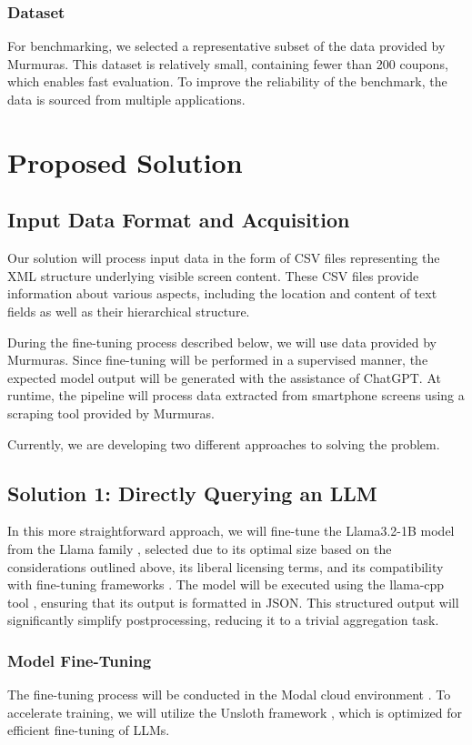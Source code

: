 \documentclass[12pt]{article}
\begin{document}
\subsubsection*{Dataset}
For benchmarking, we selected a representative subset of the data provided by Murmuras. This dataset is relatively small, containing fewer than 200 coupons, which enables fast evaluation. To improve the reliability of the benchmark, the data is sourced from multiple applications.

\section*{Proposed Solution}

\subsection*{Input Data Format and Acquisition}
Our solution will process input data in the form of CSV files representing the XML structure underlying visible screen content. These CSV files provide information about various aspects, including the location and content of text fields as well as their hierarchical structure.

During the fine-tuning process described below, we will use data provided by Murmuras. Since fine-tuning will be performed in a supervised manner, the expected model output will be generated with the assistance of ChatGPT. At runtime, the pipeline will process data extracted from smartphone screens using a scraping tool provided by Murmuras.

Currently, we are developing two different approaches to solving the problem.


\subsection*{Solution 1: Directly Querying an LLM}
In this more straightforward approach, we will fine-tune the Llama3.2-1B model from the Llama family \cite{llama32-1b}, selected due to its optimal size based on the considerations outlined above, its liberal licensing terms, and its compatibility with fine-tuning frameworks \cite{unsloth}. The model will be executed using the llama-cpp tool \cite{llamacpp}\cite{LLMmobile2024}, ensuring that its output is formatted in JSON. This structured output will significantly simplify postprocessing, reducing it to a trivial aggregation task.

\subsubsection*{Model Fine-Tuning}
The fine-tuning process will be conducted in the Modal cloud environment \cite{modal}. To accelerate training, we will utilize the Unsloth framework \cite{unsloth}, which is optimized for efficient fine-tuning of LLMs.
\end{document}
